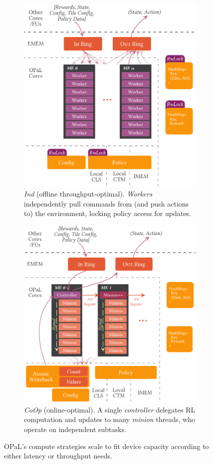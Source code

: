 \documentclass[
sigconf,natbib=false
]{acmart}
\newcommand{\approachshort}{OPaL}
\newcommand{\Coopfw}{\emph{CoOp}}
\newcommand{\Indfw}{\emph{Ind}}
\begin{document}
\begin{figure}
	\centering
	\begin{subfigure}{0.47\linewidth}
		\centering
		\includegraphics[keepaspectratio, width=0.78\linewidth]{figures/ind}
		\caption{\Indfw{} (offline throughput-optimal). \emph{Workers} independently pull commands from (and push actions to) the environment, locking policy access for updates.\label{fig:single-and-parallel:single}}
	\end{subfigure}
	\hspace{0.04\linewidth}
	\begin{subfigure}{0.47\linewidth}
		\centering
		\includegraphics[keepaspectratio, width=0.8\linewidth]{figures/coop}
		\caption{\Coopfw{} (online-optimal). A single \emph{controller} delegates RL computation and updates to many \emph{minion} threads, who operate on independent subtasks.\label{fig:single-and-parallel:parallel}}
	\end{subfigure}
	\caption{\approachshort{}'s compute strategies scale to fit device capacity according to either latency or throughput needs.\label{fig:single-and-parallel}}
\end{figure}
\end{document}
